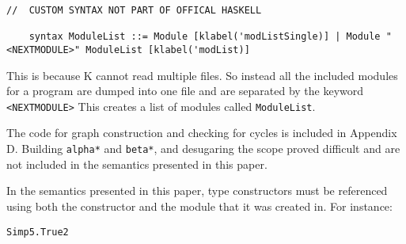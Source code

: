 \begin{lstlisting}
//  CUSTOM SYNTAX NOT PART OF OFFICAL HASKELL

    syntax ModuleList ::= Module [klabel('modListSingle)] | Module "<NEXTMODULE>" ModuleList [klabel('modList)]
\end{lstlisting}

This is because K cannot read multiple files. So instead all the included modules for a program are dumped into one file and are separated by the keyword \texttt{<NEXTMODULE>}
This creates a list of modules called \texttt{ModuleList}.

The code for graph construction and checking for cycles is included in Appendix D. Building \texttt{alpha*} and \texttt{beta*}, and desugaring the scope proved difficult and are not included in the semantics presented in this paper.

In the semantics presented in this paper, type constructors must be referenced using both the constructor and the module that it was created in. For instance:

\begin{lstlisting}
Simp5.True2
\end{lstlisting}
